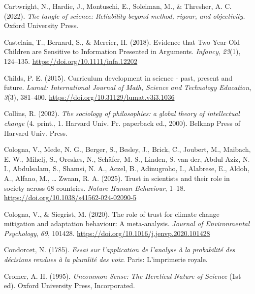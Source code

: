 \documentclass[
  jou,
  floatsintext,
  longtable,
  nolmodern,
  notxfonts,
  notimes,
  colorlinks=true,linkcolor=blue,citecolor=blue,urlcolor=blue]{apa7}
\newlength{\cslhangindent}
\newenvironment{CSLReferences}[2] %
 {\begin{list}{}{%
  \setlength{\itemindent}{0pt}
  \setlength{\leftmargin}{0pt}
  \setlength{\parsep}{0pt}
  \ifodd #1
   \setlength{\leftmargin}{\cslhangindent}
   \setlength{\itemindent}{-1\cslhangindent}
  \fi
  \setlength{\itemsep}{#2\baselineskip}}}
 {\end{list}}
\begin{document}
\begin{CSLReferences}{1}{0}
Cartwright, N., Hardie, J., Montuschi, E., Soleiman, M., \& Thresher, A.
C. (2022). \emph{The tangle of science: Reliability beyond method,
rigour, and objectivity}. Oxford University Press.

Castelain, T., Bernard, S., \& Mercier, H. (2018). Evidence that
Two{-}Year{-}Old Children are Sensitive to Information Presented in
Arguments. \emph{Infancy}, \emph{23}(1), 124--135.
\url{https://doi.org/10.1111/infa.12202}

Childs, P. E. (2015). Curriculum development in science - past, present
and future. \emph{Lumat: International Journal of Math, Science and
Technology Education}, \emph{3}(3), 381--400.
\url{https://doi.org/10.31129/lumat.v3i3.1036}

Collins, R. (2002). \emph{The sociology of philosophies: a global theory
of intellectual change} (4. print., 1. Harvard Univ. Pr. paperback ed.,
2000). Belknap Press of Harvard Univ. Press.

Cologna, V., Mede, N. G., Berger, S., Besley, J., Brick, C., Joubert,
M., Maibach, E. W., Mihelj, S., Oreskes, N., Schäfer, M. S., Linden, S.
van der, Abdul Aziz, N. I., Abdulsalam, S., Shamsi, N. A., Aczel, B.,
Adinugroho, I., Alabrese, E., Aldoh, A., Alfano, M., \ldots{} Zwaan, R.
A. (2025). Trust in scientists and their role in society across 68
countries. \emph{Nature Human Behaviour}, 1--18.
\url{https://doi.org/10.1038/s41562-024-02090-5}

Cologna, V., \& Siegrist, M. (2020). The role of trust for climate
change mitigation and adaptation behaviour: A meta-analysis.
\emph{Journal of Environmental Psychology}, \emph{69}, 101428.
\url{https://doi.org/10.1016/j.jenvp.2020.101428}

Condorcet, N. (1785). \emph{Essai sur l'application de l'analyse à la
probabilité des décisions rendues à la pluralité des voix}. Paris:
L{'}imprimerie royale.

Cromer, A. H. (1995). \emph{Uncommon Sense: The Heretical Nature of
Science} (1st ed). Oxford University Press, Incorporated.


\end{CSLReferences}
\end{document}
